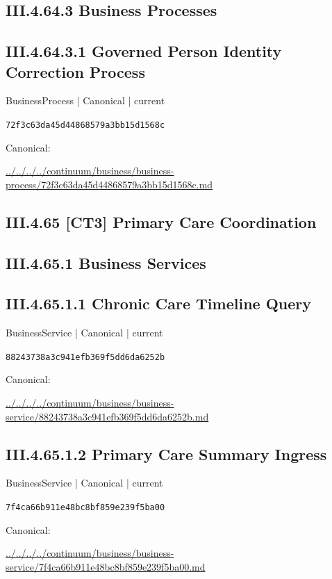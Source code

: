 \documentclass[10pt,a4paper]{article}
\begin{document}
\subsection*{III.4.64.3 Business Processes}
\subsection*{III.4.64.3.1 Governed Person Identity Correction Process}
{\small BusinessProcess | Canonical | current}\par
\texttt{72f3c63da45d44868579a3bb15d1568c}\par
Canonical: \par
{\footnotesize\url{../../../../continuum/business/business-process/72f3c63da45d44868579a3bb15d1568c.md}}\par
\subsection*{III.4.65 [CT3] Primary Care Coordination}
\subsection*{III.4.65.1 Business Services}
\subsection*{III.4.65.1.1 Chronic Care Timeline Query}
{\small BusinessService | Canonical | current}\par
\texttt{88243738a3c941efb369f5dd6da6252b}\par
Canonical: \par
{\footnotesize\url{../../../../continuum/business/business-service/88243738a3c941efb369f5dd6da6252b.md}}\par
\subsection*{III.4.65.1.2 Primary Care Summary Ingress}
{\small BusinessService | Canonical | current}\par
\texttt{7f4ca66b911e48bc8bf859e239f5ba00}\par
Canonical: \par
{\footnotesize\url{../../../../continuum/business/business-service/7f4ca66b911e48bc8bf859e239f5ba00.md}}\par
\end{document}
